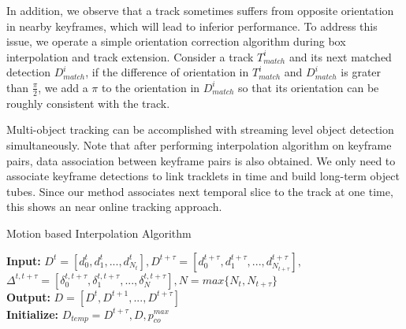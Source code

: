 \documentclass[a4paper, 10pt, conference]{ieeeconf}      %
\def\figurename{\emph{Figure}}
\begin{document}
In addition, we observe that a track sometimes suffers from opposite orientation in nearby keyframes, which will lead to inferior performance. To address this issue, we operate a simple orientation correction algorithm during box interpolation and track extension. Consider a track $T^i_{match}$ and its next matched detection $D^i_{match}$, if the difference of orientation in $T^i_{match}$ and $D^i_{match}$ is grater than $\frac{\pi}{2}$, we add a $\pi$ to the orientation in $D^i_{match}$ so that its orientation can be roughly consistent with the track. 

Multi-object tracking can be accomplished with streaming level object detection simultaneously. Note that after performing interpolation algorithm on keyframe pairs, data association between keyframe pairs is also obtained. We only need to associate keyframe detections to link tracklets in time and build long-term object tubes. Since our method associates next temporal slice to the track at one time, this shows an near online tracking approach.


\begin{algorithm}
	\small
	\caption{Motion based Interpolation Algorithm}
	\label{alg:interpolation}
	\textbf{Input: }$D^t= [d^t_0, d^t_1, ..., d^t_{N_t}], D^{t+\tau}= [d^{t+\tau}_0, d^{t+\tau}_1, ..., d^{t+\tau}_{N_{t+\tau}}],$
	$\Delta^{t, t+\tau}=[\delta^{t, t+\tau}_0, \delta^{t, t+\tau}_1, ..., \delta^{t, t+\tau}_{N}], N = max\{N_t, N_{t+\tau}\}$\\
	\textbf{Output: } $D = [D^t, D^{t+1}, ..., D^{t+\tau}]$\\
	\textbf{Initialize:} $D_{temp} = D^{t+\tau}, D, p_{co}^{max}$ \\
\end{algorithm}
\setlength{\textfloatsep}{1pt}%
\end{document}
